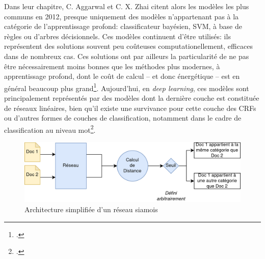 Dans leur chapitre, C. Aggarwal et C. X. Zhai citent alors les modèles les plus communs en 2012, presque uniquement des modèles n'appartenant pas à la catégorie de l'apprentissage profond: classificateur bayésien, SVM, à base de règles ou d'arbres décisionnels. Ces modèles continuent d'être utilisés: ils représentent des solutions souvent peu coûteuses computationellement, efficaces dans de nombreux cas. Ces solutions ont par ailleurs la particularité de ne pas être nécessairement moins bonnes que les méthodes plus modernes, à apprentissage profond, dont le coût de calcul -- et donc énergétique -- est en général beaucoup plus grand\footcite{fell_comparing_2019}. Aujourd'hui, en \textit{deep learning}, ces modèles sont principalement représentés par des modèles dont la dernière couche est constituée de réseaux linéaires, bien qu'il existe une survivance pour cette couche des CRFs ou d'autres formes de couches de classification, notamment dans le cadre de classification au niveau mot\footcite{alkhwiter_part--speech_2021, shang_speaker-change_2020}.


\begin{figure}
    \centering
    \includegraphics[width=\linewidth]{figures/chap4/Siamois.png}
    \caption{Architecture simplifiée d'un réseau siamois}
    \label{fig:chap4:structures:siamese-network}
\end{figure}

